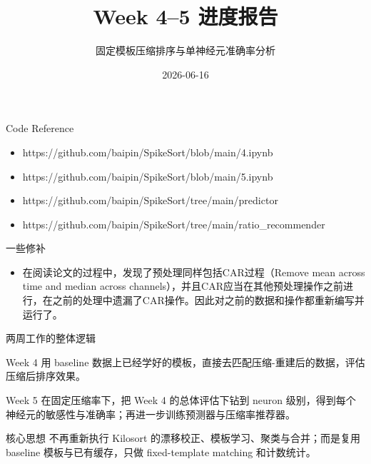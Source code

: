 \documentclass[aspectratio=169,11pt]{beamer}
\title{Week 4--5 进度报告}
\subtitle{固定模板压缩排序与单神经元准确率分析}
\author{}
\date{2026-06-16}
\begin{document}
\begin{frame}
  \titlepage
\end{frame}


\begin{frame}{Code Reference}
  \begin{itemize}
    \item https://github.com/baipin/SpikeSort/blob/main/4.ipynb
    \item https://github.com/baipin/SpikeSort/blob/main/5.ipynb
    \item https://github.com/baipin/SpikeSort/tree/main/predictor
    \item https://github.com/baipin/SpikeSort/tree/main/ratio\_recommender
  \end{itemize}
\end{frame}

\begin{frame}{一些修补}
  \begin{itemize}
    \item 在阅读论文的过程中，发现了预处理\alert{同样包括CAR过程（Remove mean across time and median across channels），并且CAR应当在其他预处理操作之前进行}，在之前的处理中遗漏了CAR操作。因此对之前的数据和操作都重新编写并运行了。
  \end{itemize}
\end{frame}

\begin{frame}{两周工作的整体逻辑}
  \begin{block}{Week 4}
    用 baseline 数据上已经学好的模板，直接去匹配压缩-重建后的数据，评估压缩后排序效果。
  \end{block}
  \begin{block}{Week 5}
    在固定压缩率下，把 Week 4 的总体评估下钻到 neuron 级别，得到每个神经元的敏感性与准确率；再进一步训练预测器与压缩率推荐器。
  \end{block}
  \begin{block}{核心思想}
    不再重新执行 Kilosort 的漂移校正、模板学习、聚类与合并；而是\alert{复用 baseline 模板与已有缓存}，只做 fixed-template matching 和计数统计。
  \end{block}
\end{frame}
\end{document}
